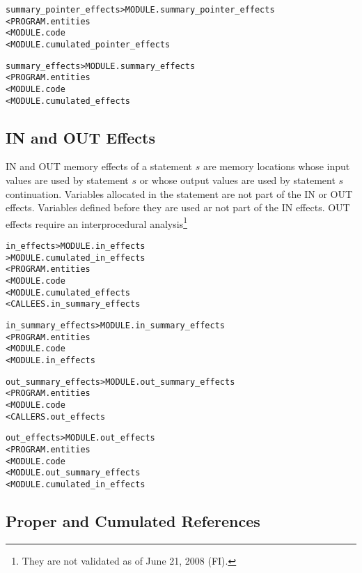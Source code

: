 \documentclass[a4paper]{report}
\newenvironment{PipsMake}{\begin{alltt}}{\end{alltt}}
\begin{document}
\begin{PipsMake}
summary_pointer_effects                 > MODULE.summary_pointer_effects
        < PROGRAM.entities
        < MODULE.code
        < MODULE.cumulated_pointer_effects
\end{PipsMake}

\begin{PipsMake}
summary_effects                 > MODULE.summary_effects
        < PROGRAM.entities
        < MODULE.code
        < MODULE.cumulated_effects
\end{PipsMake}


\subsection{IN and OUT Effects}
\label{subsubsection-in-and-out-effects}

IN and OUT memory effects of a statement $s$ are memory locations
whose input values are used by statement $s$ or whose output values
are used by statement $s$ continuation. Variables allocated in the
statement are not part of the IN or OUT effects. Variables defined
before they are used ar not part of the IN effects. OUT effects
require an interprocedural analysis\footnote{They are not validated as
of June 21, 2008 (FI).}

\begin{PipsMake}
in_effects > MODULE.in_effects
           > MODULE.cumulated_in_effects
         < PROGRAM.entities
         < MODULE.code
         < MODULE.cumulated_effects
         < CALLEES.in_summary_effects

in_summary_effects > MODULE.in_summary_effects
        < PROGRAM.entities
        < MODULE.code
        < MODULE.in_effects

out_summary_effects > MODULE.out_summary_effects
        < PROGRAM.entities
        < MODULE.code
        < CALLERS.out_effects

out_effects > MODULE.out_effects
        < PROGRAM.entities
        < MODULE.code
        < MODULE.out_summary_effects
        < MODULE.cumulated_in_effects
\end{PipsMake}

\subsection{Proper and Cumulated References}
\label{subsubsection-cumulated-effects}
\end{document}

